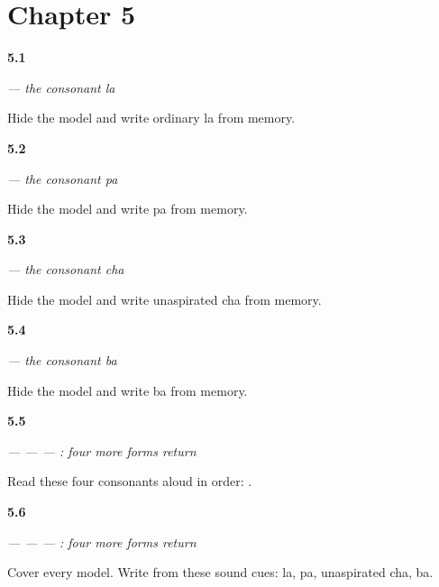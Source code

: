 \section*{Chapter 5}

\noindent\begin{minipage}[t]{\linewidth}
\raggedright
\hypertarget{review-GU-W05-la-recall}{\textbf{5.1}} \emph{ — the consonant la}\par
\small Hide the model and write ordinary la from memory.
\end{minipage}\par\medskip

\noindent\begin{minipage}[t]{\linewidth}
\raggedright
\hypertarget{review-GU-W05-pa-recall}{\textbf{5.2}} \emph{ — the consonant pa}\par
\small Hide the model and write pa from memory.
\end{minipage}\par\medskip

\noindent\begin{minipage}[t]{\linewidth}
\raggedright
\hypertarget{review-GU-W05-cha-recall}{\textbf{5.3}} \emph{ — the consonant cha}\par
\small Hide the model and write unaspirated cha from memory.
\end{minipage}\par\medskip

\noindent\begin{minipage}[t]{\linewidth}
\raggedright
\hypertarget{review-GU-W05-ba-recall}{\textbf{5.4}} \emph{ — the consonant ba}\par
\small Hide the model and write ba from memory.
\end{minipage}\par\medskip

\noindent\begin{minipage}[t]{\linewidth}
\raggedright
\hypertarget{review-GU-R05-second-four-r1-reading}{\textbf{5.5}} \emph{ —  —  — : four more forms return}\par
\small Read these four consonants aloud in order:    .
\end{minipage}\par\medskip

\noindent\begin{minipage}[t]{\linewidth}
\raggedright
\hypertarget{review-GU-R05-second-four-r1-dictation}{\textbf{5.6}} \emph{ —  —  — : four more forms return}\par
\small Cover every model. Write from these sound cues: la, pa, unaspirated cha, ba.
\end{minipage}\par\medskip

